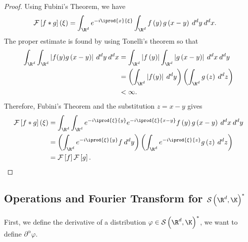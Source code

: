 \documentclass[10pt]{mypackage}
\begin{document}
\begin{proof}
  Using Fubini's Theorem, we have
  \begin{align*}
    \mathcal{F}\left[ f\ast g \right]\left( \xi \right) &= \int_{\R^d}^{} e^{ -i \iprod{x}{\xi} }\int_{\R^d}^{} f\left( y \right)g\left( x-y \right)\:d^{d}y\:d^{d}x.
  \end{align*}
  The proper estimate is found by using Tonelli's theorem so that
  \begin{align*}
    \int_{\R^d}^{} \int_{\R^d}^{} \left\vert f(y)g\left( x-y \right) \right\vert\:d^{d}y\:d^{d}x &= \int_{\R^d}^{} \left\vert f\left( y \right) \right\vert\int_{\R^d}^{} \left\vert g\left( x-y \right) \right\vert\:d^{d}x\:d^{d}y\\
                   &= \left( \int_{\R^d}^{} \left\vert f(y) \right\vert\:d^{d}y \right) \left( \int_{\R^d}^{} g\left( z \right)\:d^{d}z \right)\\
                   &< \infty.
  \end{align*}
  Therefore, Fubini's Theorem and the substitution $z = x-y$ gives
  \begin{align*}
    \mathcal{F}\left[ f\ast g \right]\left( \xi \right) &= \int_{\R^d}^{} \int_{\R^d}^{} e^{-i \iprod{\xi}{y}}e^{-i \iprod{\xi}{x-y}} f\left( y \right)g\left( x-y \right)\:d^{d}x\:d^{d}y\\
                                                        &= \left( \int_{\R^d}^{} e^{-i \iprod{\xi}{y}}f\:d^{d}y \right) \left( \int_{\R^d}^{} e^{-i \iprod{\xi}{z}}g\left( z \right)\:d^{d}z \right)\\
                                                        &= \mathcal{F}\left[ f \right]\mathcal{F}\left[ g \right].
  \end{align*}
\end{proof}
\subsection{Operations and Fourier Transform for $\mathcal{S}\left( \R^d,\K \right)^{\ast}$}%
First, we define the derivative of a distribution $\varphi\in \mathcal{S}\left( \R^d,\K \right)^{\ast}$, we want to define $\partial^{\alpha}\varphi$.
\end{document}
